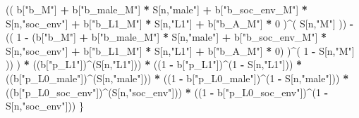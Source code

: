 \documentclass[
]{book}
\newenvironment{Shaded}{\begin{snugshade}}{\end{snugshade}}
\newcommand{\DecValTok}[1]{\textcolor[rgb]{0.00,0.00,0.81}{#1}}
\newcommand{\NormalTok}[1]{#1}
\newcommand{\SpecialCharTok}[1]{\textcolor[rgb]{0.81,0.36,0.00}{\textbf{#1}}}
\newcommand{\StringTok}[1]{\textcolor[rgb]{0.31,0.60,0.02}{#1}}
\begin{document}
\begin{Shaded}
\begin{Highlighting}[]
\NormalTok{          (( b[}\StringTok{"b\_M"}\NormalTok{] }\SpecialCharTok{+} 
\NormalTok{               b[}\StringTok{"b\_male\_M"}\NormalTok{] }\SpecialCharTok{*}\NormalTok{ S[n,}\StringTok{"male"}\NormalTok{] }\SpecialCharTok{+} 
\NormalTok{               b[}\StringTok{"b\_soc\_env\_M"}\NormalTok{] }\SpecialCharTok{*}\NormalTok{ S[n,}\StringTok{"soc\_env"}\NormalTok{] }\SpecialCharTok{+} 
\NormalTok{               b[}\StringTok{"b\_L1\_M"}\NormalTok{] }\SpecialCharTok{*}\NormalTok{ S[n,}\StringTok{"L1"}\NormalTok{] }\SpecialCharTok{+}
\NormalTok{               b[}\StringTok{"b\_A\_M"}\NormalTok{] }\SpecialCharTok{*} \DecValTok{0}\NormalTok{ )}\SpecialCharTok{\^{}}\NormalTok{( S[n,}\StringTok{"M"}\NormalTok{] )) }\SpecialCharTok{{-}} 
\NormalTok{          (( }\DecValTok{1} \SpecialCharTok{{-}}\NormalTok{ (b[}\StringTok{"b\_M"}\NormalTok{] }\SpecialCharTok{+} 
\NormalTok{                    b[}\StringTok{"b\_male\_M"}\NormalTok{] }\SpecialCharTok{*}\NormalTok{ S[n,}\StringTok{"male"}\NormalTok{] }\SpecialCharTok{+} 
\NormalTok{                    b[}\StringTok{"b\_soc\_env\_M"}\NormalTok{] }\SpecialCharTok{*}\NormalTok{ S[n,}\StringTok{"soc\_env"}\NormalTok{] }\SpecialCharTok{+} 
\NormalTok{                    b[}\StringTok{"b\_L1\_M"}\NormalTok{] }\SpecialCharTok{*}\NormalTok{ S[n,}\StringTok{"L1"}\NormalTok{] }\SpecialCharTok{+}
\NormalTok{                    b[}\StringTok{"b\_A\_M"}\NormalTok{] }\SpecialCharTok{*} \DecValTok{0}\NormalTok{) )}\SpecialCharTok{\^{}}\NormalTok{( }\DecValTok{1} \SpecialCharTok{{-}}\NormalTok{ S[n,}\StringTok{"M"}\NormalTok{] )) ) }\SpecialCharTok{*}
\NormalTok{      ((b[}\StringTok{"p\_L1"}\NormalTok{])}\SpecialCharTok{\^{}}\NormalTok{(S[n,}\StringTok{"L1"}\NormalTok{])) }\SpecialCharTok{*}
\NormalTok{      ((}\DecValTok{1} \SpecialCharTok{{-}}\NormalTok{ b[}\StringTok{"p\_L1"}\NormalTok{])}\SpecialCharTok{\^{}}\NormalTok{(}\DecValTok{1} \SpecialCharTok{{-}}\NormalTok{ S[n,}\StringTok{"L1"}\NormalTok{])) }\SpecialCharTok{*}
\NormalTok{      ((b[}\StringTok{"p\_L0\_male"}\NormalTok{])}\SpecialCharTok{\^{}}\NormalTok{(S[n,}\StringTok{"male"}\NormalTok{])) }\SpecialCharTok{*} 
\NormalTok{      ((}\DecValTok{1} \SpecialCharTok{{-}}\NormalTok{ b[}\StringTok{"p\_L0\_male"}\NormalTok{])}\SpecialCharTok{\^{}}\NormalTok{(}\DecValTok{1} \SpecialCharTok{{-}}\NormalTok{ S[n,}\StringTok{"male"}\NormalTok{])) }\SpecialCharTok{*} 
\NormalTok{      ((b[}\StringTok{"p\_L0\_soc\_env"}\NormalTok{])}\SpecialCharTok{\^{}}\NormalTok{(S[n,}\StringTok{"soc\_env"}\NormalTok{])) }\SpecialCharTok{*}
\NormalTok{      ((}\DecValTok{1} \SpecialCharTok{{-}}\NormalTok{ b[}\StringTok{"p\_L0\_soc\_env"}\NormalTok{])}\SpecialCharTok{\^{}}\NormalTok{(}\DecValTok{1} \SpecialCharTok{{-}}\NormalTok{ S[n,}\StringTok{"soc\_env"}\NormalTok{])) }
\NormalTok{    \}}
  

\end{Highlighting}
\end{Shaded}
\end{document}
